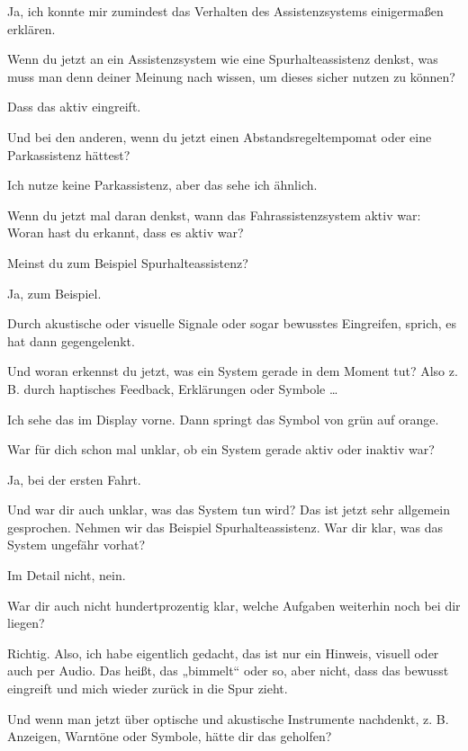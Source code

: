 Ja, ich konnte mir zumindest das Verhalten des Assistenzsystems
einigermaßen erklären.

\interviewerin
Wenn du jetzt an ein Assistenzsystem wie eine Spurhalteassistenz denkst,
was muss man denn deiner Meinung nach wissen, um dieses sicher nutzen
zu können?

Dass das aktiv eingreift.

\interviewerin
Und bei den anderen, wenn du jetzt einen Abstandsregeltempomat oder eine
Parkassistenz hättest?

Ich nutze keine Parkassistenz, aber das sehe ich ähnlich.

\interviewerin
Wenn du jetzt mal daran denkst, wann das Fahrassistenzsystem aktiv war:
Woran hast du erkannt, dass es aktiv war?

Meinst du zum Beispiel Spurhalteassistenz?

\interviewerin
Ja, zum Beispiel.

Durch akustische oder visuelle Signale oder sogar bewusstes Eingreifen,
sprich, es hat dann gegengelenkt.

\interviewerin
Und woran erkennst du jetzt, was ein System gerade in dem Moment tut?
Also z. B. durch haptisches Feedback, Erklärungen oder Symbole …

Ich sehe das im Display vorne. Dann springt das Symbol von grün auf
orange.

\interviewerin
War für dich schon mal unklar, ob ein System gerade aktiv oder inaktiv
war?

Ja, bei der ersten Fahrt.

\interviewerin
Und war dir auch unklar, was das System tun wird? Das ist jetzt sehr
allgemein gesprochen. Nehmen wir das Beispiel Spurhalteassistenz. War
dir klar, was das System ungefähr vorhat?

Im Detail nicht, nein.

\interviewerin
War dir auch nicht hundertprozentig klar, welche Aufgaben weiterhin
noch bei dir liegen?

Richtig. Also, ich habe eigentlich gedacht, das ist nur ein Hinweis,
visuell oder auch per Audio. Das heißt, das „bimmelt“ oder so, aber
nicht, dass das bewusst eingreift und mich wieder zurück in die Spur
zieht.

\interviewerin
Und wenn man jetzt über optische und akustische Instrumente nachdenkt,
z. B. Anzeigen, Warntöne oder Symbole, hätte dir das geholfen?

